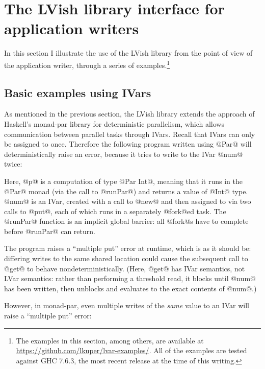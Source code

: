 \section{The LVish library interface for application writers}\label{s:lvish-api}

In this section I illustrate the use of the LVish library from the
point of view of the application writer, through a series of
examples.\footnote{The examples in this section, among others, are
  available at \url{https://github.com/lkuper/lvar-examples/}.  All of
  the examples are tested against GHC 7.6.3, the most recent release
  at the time of this writing.}

\subsection{Basic examples using IVars}

As mentioned in the previous section, the LVish library extends the
approach of Haskell's monad-par library for deterministic parallelism,
which allows communication between parallel tasks through IVars.
Recall that IVars can only be assigned to once.  Therefore the
following program written using @Par@ will deterministically raise an
error, because it tries to write to the IVar @num@ twice:

\singlespacing

\doublespacing

Here, @p@ is a computation of type @Par Int@, meaning that it runs in
the @Par@ monad (via the call to @runPar@) and returns a value of
@Int@ type.  @num@ is an IVar, created with a call to @new@ and then
assigned to via two calls to @put@, each of which runs in a separately
@fork@ed task.  The @runPar@ function is an implicit global barrier:
all @fork@s have to complete before @runPar@ can return.

The program raises a ``multiple put'' error at runtime, which is as it
should be: differing writes to the same shared location could cause
the subsequent call to @get@ to behave nondeterministically.  (Here,
@get@ has IVar semantics, not LVar semantics: rather than performing a
threshold read, it blocks until @num@ has been written, then unblocks
and evaluates to the exact contents of @num@.)

However, in monad-par, even multiple writes of the \emph{same} value
to an IVar will raise a ``multiple put'' error:

\singlespacing

\doublespacing

